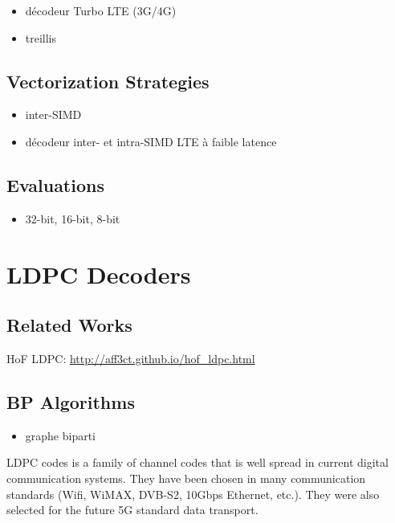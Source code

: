 \begin{itemize}
  \item décodeur Turbo LTE (3G/4G)
  \item treillis
\end{itemize}

\subsection{Vectorization Strategies}

\begin{itemize}
  \item inter-SIMD
  \item décodeur inter- et intra-SIMD LTE à faible latence
\end{itemize}

\subsection{Evaluations}

\begin{itemize}
  \item 32-bit, 16-bit, 8-bit
\end{itemize}

\section{LDPC Decoders}

\subsection{Related Works}

HoF LDPC: \url{http://aff3ct.github.io/hof_ldpc.html}

\subsection{BP Algorithms}

\begin{itemize}
  \item graphe biparti
\end{itemize}

LDPC codes is a family of channel codes that is well spread in current digital
communication systems. They have been chosen in many communication standards
(Wifi, WiMAX, DVB-S2, 10Gbps Ethernet, etc.). They were also selected for the
future 5G standard data transport.

